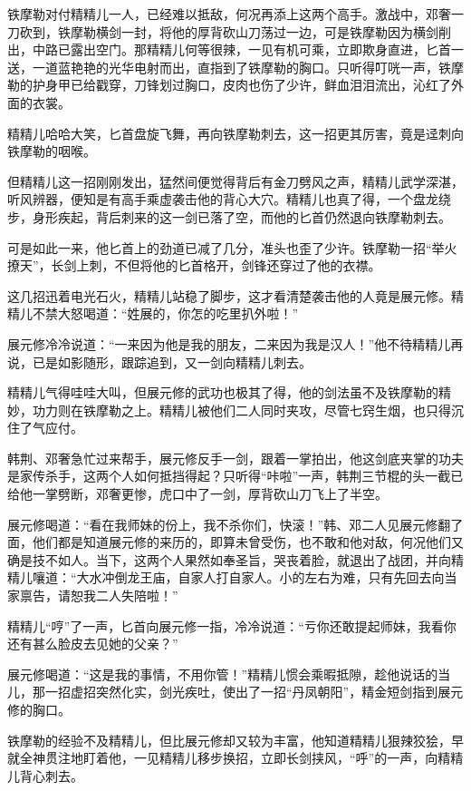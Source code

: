 \documentclass[12pt,oneside]{book}
\begin{document}
铁摩勒对付精精儿一人，已经难以抵敌，何况再添上这两个高手。激战中，邓奢一刀砍到，铁摩勒横剑一封，将他的厚背砍山刀荡过一边，可是铁摩勒因为横剑削出，中路已露出空门。那精精儿何等很辣，一见有机可乘，立即欺身直进，匕首一送，一道蓝艳艳的光华电射而出，直指到了铁摩勒的胸口。只听得叮咣一声，铁摩勒的护身甲已给戳穿，刀锋划过胸口，皮肉也伤了少许，鲜血泪泪流出，沁红了外面的衣裳。

精精儿哈哈大笑，匕首盘旋飞舞，再向铁摩勒刺去，这一招更其厉害，竟是迳刺向铁摩勒的咽喉。

但精精儿这一招刚刚发出，猛然间便觉得背后有金刀劈风之声，精精儿武学深湛，听风辨器，便知是有高手乘虚袭击他的背心大穴。精精儿也真了得，一个盘龙绕步，身形疾起，背后刺来的这一剑已落了空，而他的匕首仍然退向铁摩勒刺去。

可是如此一来，他匕首上的劲道已减了几分，准头也歪了少许。铁摩勒一招``举火撩天''，长剑上刺，不但将他的匕首格开，剑锋还穿过了他的衣襟。

这几招迅着电光石火，精精儿站稳了脚步，这才看清楚袭击他的人竟是展元修。精精儿不禁大怒喝道：``姓展的，你怎的吃里扒外啦！''

展元修冷冷说道：``一来因为他是我的朋友，二来因为我是汉人！''他不待精精儿再说，已是如影随形，跟踪追到，又一剑向精精儿刺去。

精精儿气得哇哇大叫，但展元修的武功也极其了得，他的剑法虽不及铁摩勒的精妙，功力则在铁摩勒之上。精精儿被他们二人同时夹攻，尽管七窍生烟，也只得沉住了气应付。

韩荆、邓奢急忙过来帮手，展元修反手一剑，跟着一掌拍出，他这剑底夹掌的功夫是家传杀手，这两个人如何抵挡得起？只听得``咔啦''一声，韩荆三节棍的头一截已给他一掌劈断，邓奢更惨，虎口中了一剑，厚背砍山刀飞上了半空。

展元修喝道：``看在我师妹的份上，我不杀你们，快滚！''韩、邓二人见展元修翻了面，他们都是知道展元修的来历的，即算未曾受伤，也不敢和他对敌，何况他们又确是技不如人。当下，这两个人果然如奉圣旨，哭丧着脸，就退出了战团，并向精精儿嚷道：``大水冲倒龙王庙，自家人打自家人。小的左右为难，只有先回去向当家禀告，请恕我二人失陪啦！''

精精儿``哼''了一声，匕首向展元修一指，冷冷说道：``亏你还敢提起师妹，我看你还有甚么脸皮去见她的父亲？''

展元修喝道：``这是我的事情，不用你管！''精精儿惯会乘暇抵隙，趁他说话的当儿，那一招虚招突然化实，剑光疾吐，使出了一招``丹凤朝阳''，精金短剑指到展元修的胸口。

铁摩勒的经验不及精精儿，但比展元修却又较为丰富，他知道精精儿狠辣狡狯，早就全神贯注地盯着他，一见精精儿移步换招，立即长剑挟风，``呼''的一声，向精精儿背心刺去。
\end{document}
